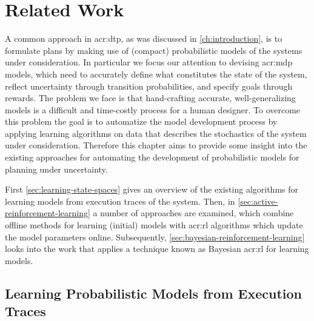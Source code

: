 \chapter{Related Work}
\label{ch:problem-related-work}

A common approach in \acrshort{acr:dtp}, as was discussed in \autoref{ch:introduction}, is to formulate plans by making use of (compact) probabilistic models of the systems under consideration.
In particular we focus our attention to devising \acrshort{acr:mdp} models, which need to accurately define what constitutes the state of the system, reflect uncertainty through transition probabilities, and specify goals through rewards.
The problem we face is that hand-crafting accurate, well-generalizing models is a difficult and time-costly process for a human designer.
To overcome this problem the goal is to automatize the model development process by applying learning algorithms on data that describes the stochastics of the system under consideration.
Therefore this chapter aims to provide some insight into the existing approaches for automating the development of probabilistic models for planning under uncertainty.

First \autoref{sec:learning-state-spaces} gives an overview of the existing algorithms for learning models from execution traces of the system.
Then, in \autoref{sec:active-reinforcement-learning} a number of approaches are examined, which combine offline methods for learning (initial) models with \acrshort{acr:rl} algorithms which update the model parameters online.
Subsequently, \autoref{sec:bayesian-reinforcement-learning} looks into the work that applies a technique known as Bayesian \acrlong{acr:rl} for learning models.

%

\section{Learning Probabilistic Models from Execution Traces}
\label{sec:learning-state-spaces}

